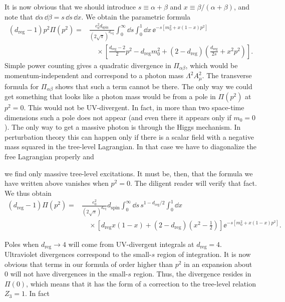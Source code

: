 It is now obvious that we should introduce $s\equiv\alpha+\beta$ and
$x\equiv\beta/(\alpha+\beta)$, and note that
$\dd\alpha\,\dd\beta=s\,\dd s\,\dd x$. We obtain the parametric formula
\[
\begin{aligned}
 (d_{\mathrm{reg}}-1)p^2\Pi(p^2)={}&\frac{e_0^2d_{\mathrm{spin}}}{(2\sqrt\pi)^{d_{\mathrm{reg}}}}
 \int_0^\infty\dd s\int_0^1\dd x\,
 \ee^{-s[m_0^2+x(1-x)p^2]}\\[-2pt]
 &\quad\times\left[\frac{d_{\mathrm{reg}}-2}{2}p^2-d_{\mathrm{reg}}m_0^2
 +(2-d_{\mathrm{reg}})\left(\frac{d_{\mathrm{reg}}}{2s}+x^2p^2\right)\right].
\end{aligned}
\]
Simple power counting gives a quadratic divergence in $\Pi_{\alpha\beta}$,
which would be momentum-independent and correspond to a photon mass
$\Lambda^2A_\mu^2$. The transverse formula for $\Pi_{\alpha\beta}$ shows that
such a term cannot be there. The only way we could get something that looks
like a photon mass would be from a pole in $\Pi(p^2)$ at $p^2=0$. This would
not be UV-divergent. In fact, in more than two space-time dimensions such a
pole does not appear (and even there it appears only if $m_0=0$). The only way
to get a massive photon is through the Higgs mechanism. In perturbation theory
this can happen only if there is a scalar field with a negative mass squared in
the tree-level Lagrangian. In that case we have to diagonalize the free
Lagrangian properly and

we find only massive tree-level excitations. It must be, then, that the formula
we have written above vanishes when $p^2=0$. The diligent reader will verify
that fact. We thus obtain
\[
\begin{aligned}
 (d_{\mathrm{reg}}-1)\Pi(p^2)={}&\frac{e_0^2}{(2\sqrt\pi)^{d_{\mathrm{reg}}}}d_{\mathrm{spin}}
 \int_0^\infty\dd s\,s^{1-d_{\mathrm{reg}}/2}\int_0^1\dd x\\[-2pt]
 &\quad\times\left[d_{\mathrm{reg}}x(1-x)+(2-d_{\mathrm{reg}})\left(x^2-\frac12\right)
 \right]\ee^{-s[m_0^2+x(1-x)p^2]}.
\end{aligned}
\]

Poles when $d_{\mathrm{reg}}\to4$ will come from UV-divergent integrals at
$d_{\mathrm{reg}}=4$.
Ultraviolet divergences correspond to the small-$s$ region of integration. It
is now obvious that terms in our formula of order higher than $p^2$ in an
expansion about $0$ will not have divergences in the small-$s$ region. Thus,
the divergence resides in $\Pi(0)$, which means that it has the form of a
correction to the tree-level relation $Z_3=1$. In fact

